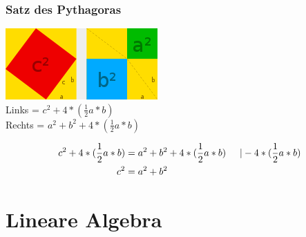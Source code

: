 \documentclass[a4paper]{article} %
\begin{document}
	\subsubsection{Satz des Pythagoras}
	\includegraphics[width=220 px, height=103 px]{pytha.png}\\
	Links = $c^2+ 4*(\frac{1}{2}a*b)$\\
	Rechts = $a^2+b^2+4*(\frac{1}{2}a*b)$

	\begin{align*}
	c^2+ 4*(\frac{1}{2}a*b) &= a^2+b^2+4*(\frac{1}{2}a*b)  \hspace{0.5 cm} |-4*(\frac{1}{2}a*b)\\
	c^2 &= a^2+b^2
	\end{align*}




	\section{Lineare Algebra}
\end{document}
